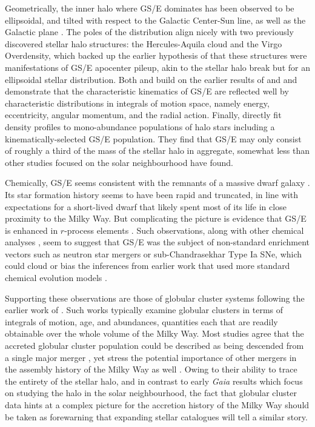 Geometrically, the inner halo where GS/E dominates has been observed to be ellipsoidal, and tilted with respect to the Galactic Center-Sun line, as well as the Galactic plane \parencite{iorio19}. The poles of the distribution align nicely with two previously discovered stellar halo structures: the Hercules-Aquila cloud and the Virgo Overdensity, which backed up the earlier hypothesis of \textcite{simion19} that these structures were manifestations of GS/E apocenter pileup, akin to the stellar halo break but for an ellipsoidal stellar distribution. Both \textcite{koppelman18} and \textcite{feuillet20} build on the earlier results of \textcite{helmi18} and \textcite{myeong18} and demonstrate that the characteristic kinematics of GS/E are reflected well by characteristic distributions in integrals of motion space, namely energy, eccentricity, angular momentum, and the radial action. Finally, \textcite{mackereth20} directly fit density profiles to mono-abundance populations of halo stars including a kinematically-selected GS/E population. They find that GS/E may only consist of roughly a third of the mass of the stellar halo in aggregate, somewhat less than other studies focused on the solar neighbourhood have found.

Chemically, GS/E seems consistent with the remnants of a massive dwarf galaxy \parencite{fernandezalvar18,vincenzo19,monty20,hasselquist21}. Its star formation history seems to have been rapid and truncated, in line with expectations for a short-lived dwarf that likely spent most of its life in close proximity to the Milky Way. But complicating the picture is evidence that GS/E is enhanced in $r$-process elements \parencite{aguado21,matsuno21}. Such observations, along with other chemical analyses \parencite{sanders21}, seem to suggest that GS/E was the subject of non-standard enrichment vectors such as neutron star mergers or sub-Chandrasekhar Type Ia SNe, which could cloud or bias the inferences from earlier work that used more standard chemical evolution models \parencite[on which basis][ argues against a rapid and truncated chemical enrichment]{sanders21}. 

Supporting these observations are those of globular cluster systems following the earlier work of \textcite{myeong18}. Such works typically examine globular clusters in terms of integrals of motion, age, and abundances, quantities each that are readily obtainable over the whole volume of the Milky Way. Most studies agree that the accreted globular cluster population could be described as being descended from a single major merger \parencite{massari19}, yet stress the potential importance of other mergers in the assembly history of the Milky Way as well \parencite{myeong19,kruijssen19b,forbes20}. Owing to their ability to trace the entirety of the stellar halo, and in contrast to early \textit{Gaia} results which focus on studying the halo in the solar neighbourhood, the fact that globular cluster data hints at a complex picture for the accretion history of the Milky Way should be taken as forewarning that expanding stellar catalogues will tell a similar story.

